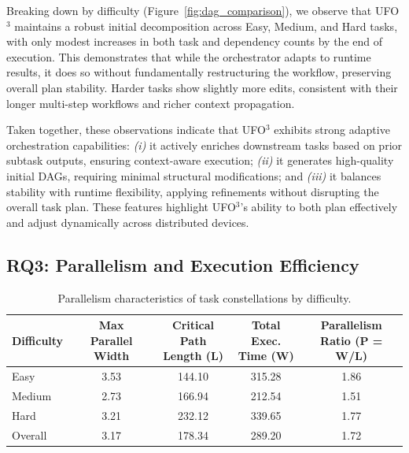 \documentclass[10pt]{article} %
\newcommand{\ufo}{\textsc{UFO}$^3$\xspace}
\begin{document}
Breaking down by difficulty (Figure~\ref{fig:dag_comparison}), we observe that \ufo maintains a robust initial decomposition across Easy, Medium, and Hard tasks, with only modest increases in both task and dependency counts by the end of execution. This demonstrates that while the orchestrator adapts to runtime results, it does so without fundamentally restructuring the workflow, preserving overall plan stability. Harder tasks show slightly more edits, consistent with their longer multi-step workflows and richer context propagation.

Taken together, these observations indicate that \ufo exhibits strong adaptive orchestration capabilities: \textit{(i)} it actively enriches downstream tasks based on prior subtask outputs, ensuring context-aware execution; \textit{(ii)} it generates high-quality initial DAGs, requiring minimal structural modifications; and \textit{(iii)} it balances stability with runtime flexibility, applying refinements without disrupting the overall task plan. These features highlight \ufo's ability to both plan effectively and adjust dynamically across distributed devices.

\subsection{RQ3: Parallelism and Execution Efficiency}
\label{subsec:rq3}

\begin{table}[t]
\centering
\caption{Parallelism characteristics of task constellations by difficulty.}
\begin{tabular}{lcccc}
\toprule
\textbf{Difficulty} & 
\makecell{\textbf{Max}\\\textbf{Parallel Width}} & 
\makecell{\textbf{Critical Path}\\\textbf{Length (L)}} & 
\makecell{\textbf{Total Exec.}\\\textbf{Time (W)}} & 
\makecell{\textbf{Parallelism}\\\textbf{Ratio (P = W/L)}} \\
\midrule
Easy & 3.53 & 144.10 & 315.28 & 1.86 \\
Medium & 2.73 & 166.94 & 212.54 & 1.51 \\
Hard & 3.21 & 232.12 & 339.65 & 1.77 \\
\midrule
Overall & 3.17 & 178.34 & 289.20 & 1.72 \\
\bottomrule
\end{tabular}
\label{tab:parallelism}
\end{table}
\end{document}
